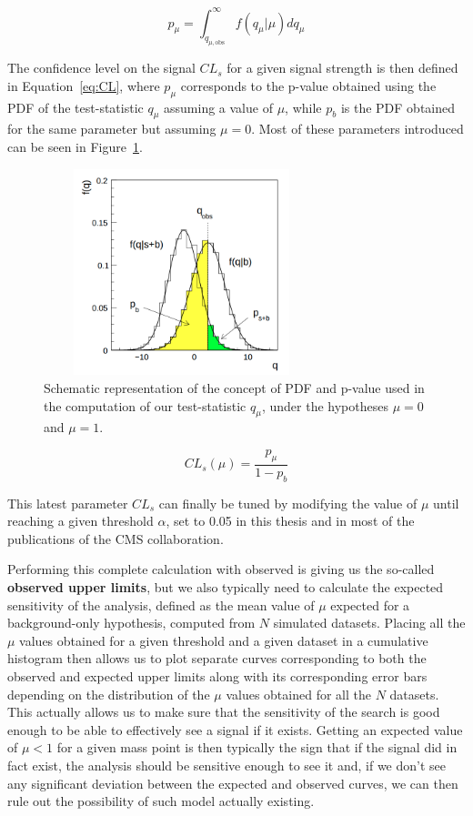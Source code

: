 \documentclass[a4paper, 10pt, openright]{report}
\begin{document}
\begin{equation}
\label{p-value}
p_\mu = \int_{q_{\mu, \text{obs}}}^\infty f(q_\mu|\mu) dq_\mu 
\end{equation}

The confidence level on the signal $CL_s$ for a given signal strength is then defined in Equation~\ref{eq:CL}, where $p_\mu$ corresponds to the p-value obtained using the \ac{PDF} of the test-statistic $q_\mu$ assuming a value of $\mu$, while $p_b$ is the \ac{PDF} obtained for the same parameter but assuming $\mu = 0$. Most of these parameters introduced can be seen in Figure~\ref{fig:stat}.

\begin{figure}[htbp]
\centering
\includegraphics[width=8cm, height=6cm]{figs/stat.png}
\caption{Schematic representation of the concept of \ac{PDF} and p-value used in the computation of our test-statistic $q_\mu$, under the hypotheses $\mu = 0$ and $\mu = 1$.}
\label{fig:stat}
\end{figure}

\begin{equation}
\label{eq:CL}
CL_s(\mu) = \frac{p_\mu}{1-p_b}
\end{equation}

This latest parameter $CL_s$ can finally be tuned by modifying the value of $\mu$ until reaching a given threshold $\alpha$, set to 0.05 in this thesis and in most of the publications of the \ac{CMS} collaboration.

Performing this complete calculation with observed is giving us the so-called \textbf{observed upper limits}, but we also typically need to calculate the expected sensitivity of the analysis, defined as the mean value of $\mu$ expected for a background-only hypothesis, computed from $N$ simulated datasets. Placing all the $\mu$ values obtained for a given threshold and a given dataset in a cumulative histogram then allows us to plot separate curves corresponding to both the observed and expected upper limits along with its corresponding error bars depending on the distribution of the $\mu$ values obtained for all the $N$ datasets. This actually allows us to make sure that the sensitivity of the search is good enough to be able to effectively see a signal if it exists. Getting an expected value of $\mu < 1$ for a given mass point is then typically the sign that if the signal did in fact exist, the analysis should be sensitive enough to see it and, if we don't see any significant deviation between the expected and observed curves, we can then rule out the possibility of such model actually existing.
\end{document}
